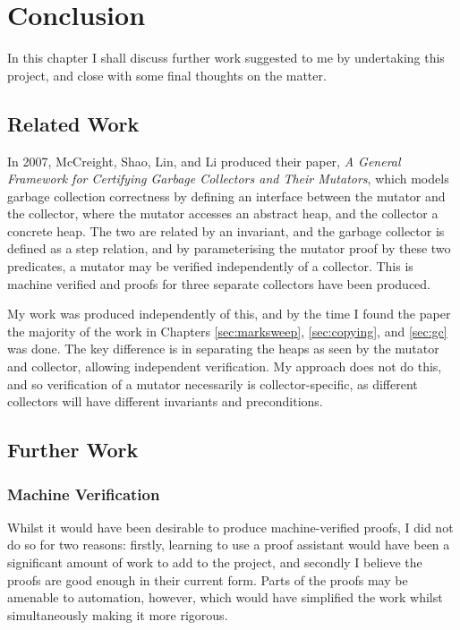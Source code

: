 \chapter{Conclusion}
\label{sec:conclusion}

In this chapter I shall discuss further work suggested to me by
undertaking this project, and close with some final thoughts on the
matter.

\section{Related Work}
\label{sec:conclusion-related}

In 2007, McCreight, Shao, Lin, and Li produced their paper, \textit{A
  General Framework for Certifying Garbage Collectors and Their
  Mutators}\cite{McCreight07}, which models garbage collection
correctness by defining an interface between the mutator and the
collector, where the mutator accesses an abstract heap, and the
collector a concrete heap. The two are related by an invariant, and
the garbage collector is defined as a step relation, and by
parameterising the mutator proof by these two predicates, a mutator
may be verified independently of a collector. This is machine
verified and proofs for three separate collectors have been
produced.

My work was produced independently of this, and by the time I found
the paper the majority of the work in Chapters \ref{sec:marksweep},
\ref{sec:copying}, and \ref{sec:gc} was done. The key difference is in
separating the heaps as seen by the mutator and collector, allowing
independent verification. My approach does not do this, and so
verification of a mutator necessarily is collector-specific, as
different collectors will have different invariants and preconditions.

\section{Further Work}
\label{sec:conclusion-further}

\subsection{Machine Verification}
\label{sec:conclusion-further-machineverification}

Whilst it would have been desirable to produce machine-verified
proofs, I did not do so for two reasons: firstly, learning to use a
proof assistant would have been a significant amount of work to add to
the project, and secondly I believe the proofs are good enough in
their current form. Parts of the proofs may be amenable to automation,
however, which would have simplified the work whilst simultaneously
making it more rigorous.

